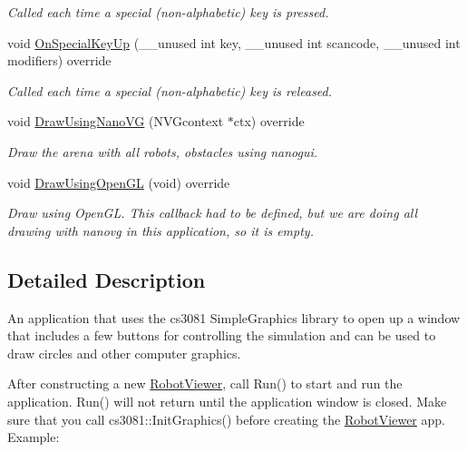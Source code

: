 \begin{DoxyCompactItemize}
\begin{DoxyCompactList}\small\item\em Called each time a special (non-\/alphabetic) key is pressed. \end{DoxyCompactList}\item 
void \hyperlink{classRobotViewer_a4d81343908c8e2ef4e48c6320b52ffdd}{On\+Special\+Key\+Up} (\+\_\+\+\_\+unused int key, \+\_\+\+\_\+unused int scancode, \+\_\+\+\_\+unused int modifiers) override
\begin{DoxyCompactList}\small\item\em Called each time a special (non-\/alphabetic) key is released. \end{DoxyCompactList}\item 
void \hyperlink{classRobotViewer_ac67e2c6bc6f4ddc6c50d4c7e05d99662}{Draw\+Using\+Nano\+VG} (N\+V\+Gcontext $\ast$ctx) override
\begin{DoxyCompactList}\small\item\em Draw the arena with all robots, obstacles using nanogui. \end{DoxyCompactList}\item 
\mbox{\label{classRobotViewer_accb905122b66ed5a084c77b078216083}} 
void \hyperlink{classRobotViewer_accb905122b66ed5a084c77b078216083}{Draw\+Using\+Open\+GL} (void) override
\begin{DoxyCompactList}\small\item\em Draw using Open\+GL. This callback had to be defined, but we are doing all drawing with nanovg in this application, so it is empty. \end{DoxyCompactList}\end{DoxyCompactItemize}


\subsection{Detailed Description}
An application that uses the cs3081 Simple\+Graphics library to open up a window that includes a few buttons for controlling the simulation and can be used to draw circles and other computer graphics. 

After constructing a new \hyperlink{classRobotViewer}{Robot\+Viewer}, call Run() to start and run the application. Run() will not return until the application window is closed. Make sure that you call cs3081\+::\+Init\+Graphics() before creating the \hyperlink{classRobotViewer}{Robot\+Viewer} app. Example\+:


